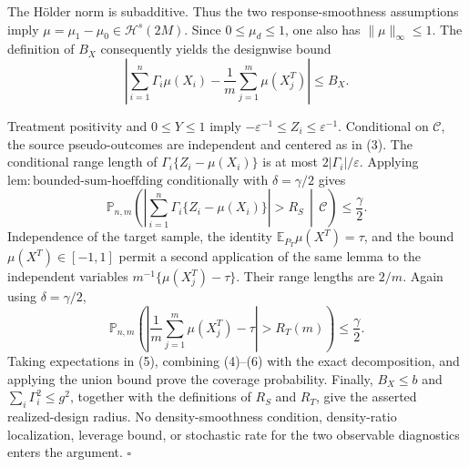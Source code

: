 The H\"older norm is subadditive. Thus the two response-smoothness assumptions imply \(\mu=\mu_1-\mu_0\in\mathcal H^s(2M)\). Since \(0\le\mu_d\le1\), one also has \(\|\mu\|_\infty\le1\). The definition of \(B_X\) consequently yields the designwise bound
\[
\left|\sum_{i=1}^n\Gamma_i\mu(X_i)-\frac1m\sum_{j=1}^m\mu(X_j^T)\right|\le B_X.
\tag{4}
\]

Treatment positivity and \(0\le Y\le1\) imply \(-\varepsilon^{-1}\le Z_i\le\varepsilon^{-1}\). Conditional on \(\mathcal C\), the source pseudo-outcomes are independent and centered as in (3). The conditional range length of \(\Gamma_i\{Z_i-\mu(X_i)\}\) is at most \(2|\Gamma_i|/\varepsilon\). Applying \(\mathrm{lem:bounded\text{-}sum\text{-}hoeffding}\) conditionally with \(\delta=\gamma/2\) gives
\[
\mathbb P_{n,m}\!\left(
\left|\sum_{i=1}^n\Gamma_i\{Z_i-\mu(X_i)\}\right|>R_S
\,\middle|\,\mathcal C\right)\le\frac\gamma2.
\tag{5}
\]
Independence of the target sample, the identity \(\mathbb E_{P_T}\mu(X^T)=\tau\), and the bound \(\mu(X^T)\in[-1,1]\) permit a second application of the same lemma to the independent variables \(m^{-1}\{\mu(X_j^T)-\tau\}\). Their range lengths are \(2/m\). Again using \(\delta=\gamma/2\),
\[
\mathbb P_{n,m}\!\left(
\left|\frac1m\sum_{j=1}^m\mu(X_j^T)-\tau\right|>R_T(m)
\right)\le\frac\gamma2.
\tag{6}
\]
Taking expectations in (5), combining (4)--(6) with the exact decomposition, and applying the union bound prove the coverage probability. Finally, \(B_X\le b\) and \(\sum_i\Gamma_i^2\le g^2\), together with the definitions of \(R_S\) and \(R_T\), give the asserted realized-design radius. No density-smoothness condition, density-ratio localization, leverage bound, or stochastic rate for the two observable diagnostics enters the argument. \(\square\)